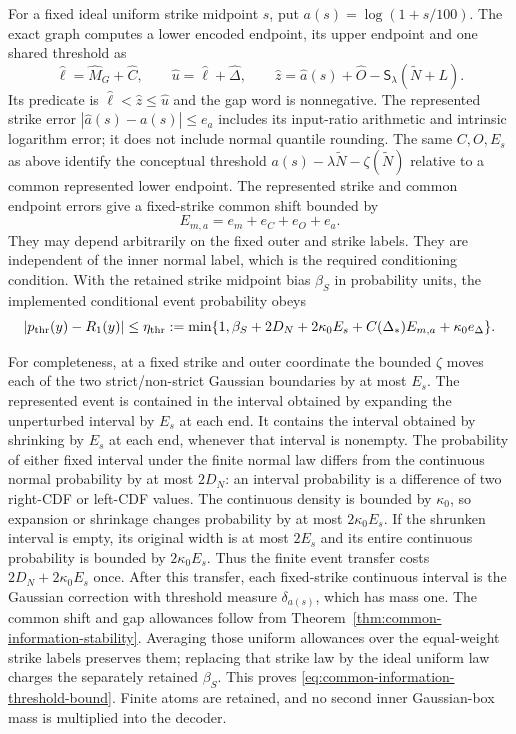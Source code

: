 \documentclass[11pt]{article}
\begin{document}
For a fixed ideal uniform strike midpoint $s$, put $a(s)=\log(1+s/100)$.
The exact graph computes a lower encoded endpoint, its upper endpoint
and one shared threshold as
\begin{equation}
 \widehat\ell=\widehat M_G+\widehat C,\qquad
 \widehat u=\widehat\ell+\widehat\Delta,\qquad
 \widehat z=\widehat a(s)+\widehat O
                       -\mathsf S_\lambda(\widetilde N+L).
 \label{eq:common-information-threshold-endpoints}
\end{equation}
Its predicate is $\widehat\ell<\widehat z\leq\widehat u$ and the gap
word is nonnegative. The represented strike error
$|\widehat a(s)-a(s)|\leq e_a$ includes its input-ratio arithmetic
and intrinsic logarithm error; it does not include normal quantile
rounding. The same $C,O,E_s$ as above identify the conceptual threshold
$a(s)-\lambda\widetilde N-\zeta(\widetilde N)$ relative to a common
represented lower endpoint. The represented strike and common endpoint
errors give a fixed-strike common shift bounded by
\begin{equation}
 E_{m,a}=e_m+e_C+e_O+e_a.
 \label{eq:common-information-threshold-common-error}
\end{equation}
They may depend arbitrarily on the fixed outer and strike labels.
They are independent of the inner normal label, which is the required
conditioning condition. With the retained strike midpoint bias $\beta_S$
in probability units, the implemented conditional event probability
obeys
\begin{equation}
 |p_{\rm thr}(y)-R_1(y)|\leq\eta_{\rm thr}:=
 \min\{1,\beta_S+2D_N+2\kappa_0E_s
                     +C(\Delta_*)E_{m,a}+\kappa_0e_\Delta\}.
 \label{eq:common-information-threshold-bound}
\end{equation}

For completeness, at a fixed strike and outer coordinate the bounded
$\zeta$ moves each of the two strict/non-strict Gaussian boundaries by
at most $E_s$. The represented event is contained in the interval
obtained by expanding the unperturbed interval by $E_s$ at each end.
It contains the interval obtained by shrinking by $E_s$ at each end,
whenever that interval is nonempty. The probability of either fixed
interval under the finite normal law differs from the continuous normal
probability by at most $2D_N$: an interval probability is a difference
of two right-CDF or left-CDF values. The continuous density is bounded
by $\kappa_0$, so expansion or shrinkage changes probability by at most
$2\kappa_0E_s$. If the shrunken interval is empty, its original width is
at most $2E_s$ and its entire continuous probability is bounded by
$2\kappa_0E_s$. Thus the finite event transfer costs $2D_N+2\kappa_0E_s$ once.
After this transfer, each fixed-strike continuous interval is the
Gaussian correction with threshold measure $\delta_{a(s)}$, which has
mass one. The common shift and gap allowances follow from
Theorem~\ref{thm:common-information-stability}. Averaging those uniform
allowances over the equal-weight strike labels preserves them; replacing
that strike law by the ideal uniform law charges the separately retained
$\beta_S$. This proves \eqref{eq:common-information-threshold-bound}.
Finite atoms are retained, and no second inner Gaussian-box mass is
multiplied into the decoder.
\end{document}
